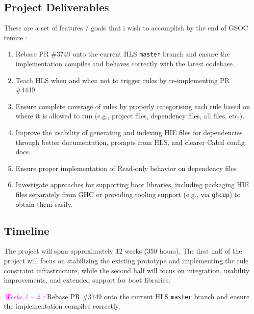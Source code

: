 \documentclass[a4paper,12pt]{article}
\begin{document}
\subsection{Project Deliverables}
These are a set of features / goals that i wish to accomplish by the end of GSOC tenure :
\begin{enumerate}[label=\textcolor{magenta}{D\arabic*.}]
\item \label{PD1} Rebase PR \#3749 onto the current HLS \texttt{master} branch and ensure the implementation compiles and behaves correctly with the latest codebase.

\item \label{PD2}Teach HLS when and when not to trigger rules by re-implementing PR \#4449.

\item \label{PD3}Ensure complete coverage of rules by properly categorising each rule based on where it is allowed to run (e.g., project files, dependency files, all files, etc.).

\item \label{PD4}Improve the usability of generating and indexing HIE files for dependencies through better documentation, prompts from HLS, and clearer Cabal config docs.

\item \label{PD5}Ensure proper implementation of Read-only behavior on dependency files

\item \label{PD6}Investigate approaches for supporting boot libraries, including packaging HIE files separately from GHC or providing tooling support (e.g., via \texttt{ghcup}) to obtain them easily.
\end{enumerate}

\subsection{Timeline}

The project will span approximately 12 weeks (350 hours). The first half of the project will focus on stabilizing the existing prototype and implementing the rule constraint infrastructure, while the second half will focus on integration, usability improvements, and extended support for boot libraries.
\vspace{0.6em}

\textcolor{magenta}{\textit{Weeks 1 -- 2 :  }} Rebase PR \#3749 onto the current HLS \texttt{master} branch and ensure the implementation compiles correctly.
\vspace{0.6em}
\end{document}
